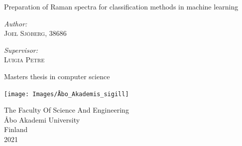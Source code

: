 \documentclass[a4paper, 12pt, oneside]{book}
\begin{document}
\pagestyle{empty}    
\begingroup
{}


\begin{titlepage}
    \begin{center}
        \vspace*{1cm}
            
         
        \vspace{1.5cm}

\vspace{0.4cm}

{\huge Preparation of Raman spectra for classification methods in machine learning} \\[0.4cm]

\vspace{1.5cm}         
        
\begin{minipage}{0.4\textwidth}
\begin{flushleft} \large
\emph{Author:}\\
\textsc{Joel Sjöberg, 38686}
\end{flushleft}
\end{minipage}
\begin{minipage}{0.4\textwidth}
\begin{flushright} \large
\emph{Supervisor:} \\
\textsc{Luigia Petre}
\end{flushright}
\end{minipage}        
        
        
        \Huge
        \vfill
        
        Masters thesis in computer science
            
        \vspace{0.8cm}
            
        \texttt{[image: Images/Åbo\_Akademis\_sigill]}
            
        \Large
        The Faculty Of Science And Engineering\\
        Åbo Akademi University\\
        Finland\\
        2021
            
    \end{center}
\end{titlepage}
\end{document}
